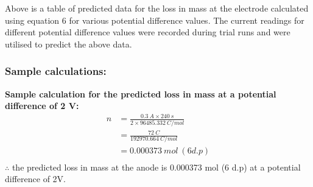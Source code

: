\documentclass[11pt, a4]{article}
\begin{document}
			Above is a table of predicted data for the loss in mass at the electrode calculated using equation 6 for various potential difference values. The current readings for different potential difference values were recorded during trial runs and were utilised to predict the above data.
			
				\subsubsection{Sample calculations:}
					\textbf{Sample calculation for the predicted loss in mass at a potential difference of 2 V:}
					\begin{equation*}
						\begin{split}
							n &= \frac{0.3 \ A \times 240 \ s}{2 \times 96485.332 \ C/mol}\\
							&= \frac{72 \ C}{192970.664 \ C/mol}\\
							&= 0.000373 \ mol \ (6 d.p)\\
						\end{split}
					\end{equation*}
				$\therefore$ the predicted loss in mass at the anode is 0.000373 mol (6 d.p) at a potential difference of 2V.
				
\end{document}
